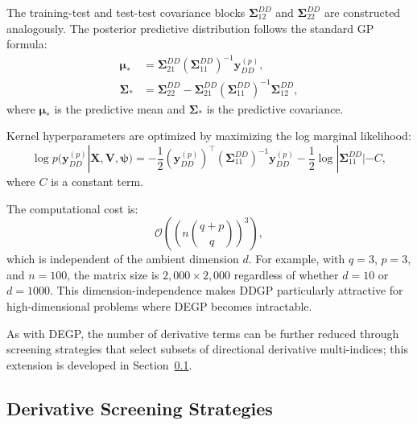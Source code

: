 \documentclass[12pt]{article}
\begin{document}
The training-test and test-test covariance blocks $\boldsymbol{\Sigma}_{12}^{DD}$ and $\boldsymbol{\Sigma}_{22}^{DD}$ are constructed analogously. The posterior predictive distribution follows the standard GP formula:
\begin{equation}
	\label{eqn:ddgp_posterior}
	\begin{aligned}
		\boldsymbol{\mu}_{*} &= \boldsymbol{\Sigma}_{21}^{DD} \left(\boldsymbol{\Sigma}_{11}^{DD}\right)^{-1} \mathbf{y}_{DD}^{(p)}, \\
		\boldsymbol{\Sigma}_{*} &= \boldsymbol{\Sigma}_{22}^{DD} - \boldsymbol{\Sigma}_{21}^{DD} \left(\boldsymbol{\Sigma}_{11}^{DD}\right)^{-1} \boldsymbol{\Sigma}_{12}^{DD},
	\end{aligned}
\end{equation}
where $\boldsymbol{\mu}_*$ is the predictive mean and $\boldsymbol{\Sigma}_*$ is the predictive covariance.

Kernel hyperparameters are optimized by maximizing the log marginal likelihood:
\begin{equation}
	\label{eqn:ddgp_mll}
	\log p(\mathbf{y}_{DD}^{(p)}|\mathbf{X}, \mathbf{V}, \boldsymbol{\psi}) = -\frac{1}{2} \left(\mathbf{y}_{DD}^{(p)}\right)^\top \left(\boldsymbol{\Sigma}_{11}^{DD}\right)^{-1} \mathbf{y}_{DD}^{(p)} - \frac{1}{2}\log|\boldsymbol{\Sigma}_{11}^{DD}| - C,
\end{equation}
where $C$ is a constant term.

The computational cost is:
\begin{equation}
	\mathcal{O}\left(\left(n\binom{q+p}{q}\right)^3\right),
\end{equation}
which is independent of the ambient dimension $d$. For example, with $q=3$, $p=3$, and $n=100$, the matrix size is $2{,}000 \times 2{,}000$ regardless of whether $d=10$ or $d=1000$. This dimension-independence makes DDGP particularly attractive for high-dimensional problems where DEGP becomes intractable.

As with DEGP, the number of derivative terms can be further reduced through screening strategies that select subsets of directional derivative multi-indices; this extension is developed in Section~\ref{subsec:derivative_screening}.

\subsection{Derivative Screening Strategies}
\label{subsec:derivative_screening}
\end{document}
